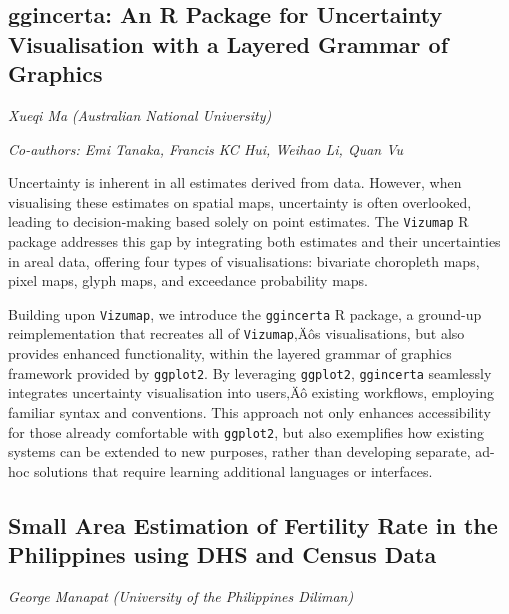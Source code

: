\documentclass[
]{scrreprt}
\begin{document}
\subsection{ggincerta: An R Package for Uncertainty Visualisation with a
Layered Grammar of
Graphics}\label{ggincerta-an-r-package-for-uncertainty-visualisation-with-a-layered-grammar-of-graphics}

\emph{Xueqi Ma} \emph{(Australian National University)}

\emph{Co-authors: Emi Tanaka, Francis KC Hui, Weihao Li, Quan Vu}

\setlength{\parskip}{0.5em}

Uncertainty is inherent in all estimates derived from data. However,
when visualising these estimates on spatial maps, uncertainty is often
overlooked, leading to decision-making based solely on point estimates.
The \texttt{Vizumap} R package addresses this gap by integrating both
estimates and their uncertainties in areal data, offering four types of
visualisations: bivariate choropleth maps, pixel maps, glyph maps, and
exceedance probability maps.

Building upon \texttt{Vizumap}, we introduce the \texttt{ggincerta} R
package, a ground-up reimplementation that recreates all of
\texttt{Vizumap}‚Äôs visualisations, but also provides enhanced
functionality, within the layered grammar of graphics framework provided
by \texttt{ggplot2}. By leveraging \texttt{ggplot2}, \texttt{ggincerta}
seamlessly integrates uncertainty visualisation into users‚Äô existing
workflows, employing familiar syntax and conventions. This approach not
only enhances accessibility for those already comfortable with
\texttt{ggplot2}, but also exemplifies how existing systems can be
extended to new purposes, rather than developing separate, ad-hoc
solutions that require learning additional languages or interfaces.

\subsection{Small Area Estimation of Fertility Rate in the Philippines
using DHS and Census
Data}\label{small-area-estimation-of-fertility-rate-in-the-philippines-using-dhs-and-census-data}

\emph{George Manapat} \emph{(University of the
Philippines Diliman)}

\setlength{\parskip}{0.5em}
\end{document}
